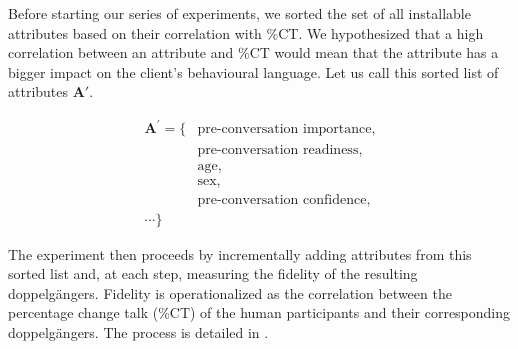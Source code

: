 Before starting our series of experiments, we sorted the set of all installable
attributes based on their correlation with \%CT. We hypothesized that a high
correlation between an attribute and \%CT would mean that the attribute has a bigger
impact on the client's behavioural language. Let us call this sorted list of attributes
$\mathbf{A'}$.

$$
	\begin{aligned}
		{\textbf{A}}^{'} = \{ & \text{pre-conversation importance,} \\
		                      & \text{pre-conversation readiness,}  \\
		                      & \text{age,}                         \\
		                      & \text{sex,}                         \\
		                      & \text{pre-conversation confidence,} \\
		\cdots \}
	\end{aligned}
$$

The experiment then proceeds by incrementally adding attributes from this sorted list
and, at each step, measuring the fidelity of the resulting doppelgängers. Fidelity is
operationalized as the correlation between the percentage change talk (\%CT) of the
human participants and their corresponding doppelgängers. The process is detailed in
.

